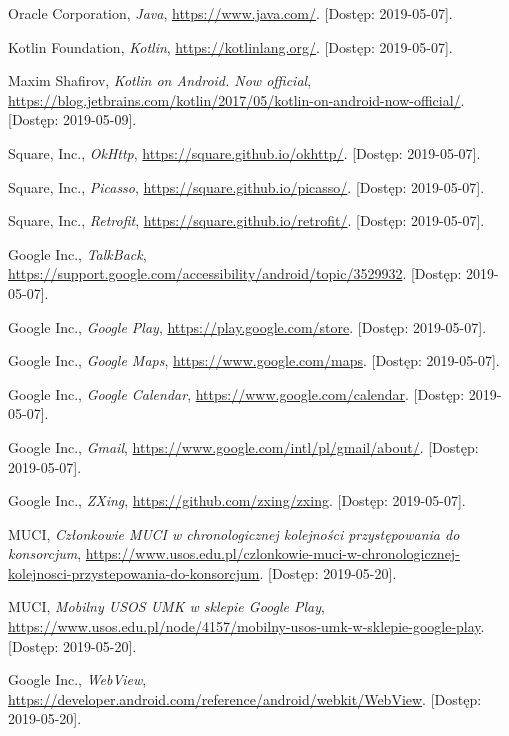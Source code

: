 \documentclass{pracamgr}
\begin{document}
\begin{thebibliography}{99}
 Oracle Corporation, \textit{Java}, \url{https://www.java.com/}. [Dostęp: 2019-05-07].

 Kotlin Foundation, \textit{Kotlin}, \url{https://kotlinlang.org/}. [Dostęp: 2019-05-07].

 Maxim Shafirov, \textit{Kotlin on Android. Now official},
	\url{https://blog.jetbrains.com/kotlin/2017/05/kotlin-on-android-now-official/}. [Dostęp: 2019-05-09].

 Square, Inc., \textit{OkHttp},	\url{https://square.github.io/okhttp/}. [Dostęp: 2019-05-07].

 Square, Inc., \textit{Picasso}, \url{https://square.github.io/picasso/}. [Dostęp: 2019-05-07].

 Square, Inc., \textit{Retrofit}, \url{https://square.github.io/retrofit/}. [Dostęp: 2019-05-07].

 Google Inc., \textit{TalkBack}, \url{https://support.google.com/accessibility/android/topic/3529932}. [Dostęp: 2019-05-07].

 Google Inc., \textit{Google Play}, \url{https://play.google.com/store}. [Dostęp: 2019-05-07].

 Google Inc., \textit{Google Maps},	\url{https://www.google.com/maps}. [Dostęp: 2019-05-07].

 Google Inc., \textit{Google Calendar},	\url{https://www.google.com/calendar}. [Dostęp: 2019-05-07].

 Google Inc., \textit{Gmail}, \url{https://www.google.com/intl/pl/gmail/about/}. [Dostęp: 2019-05-07].

 Google Inc., \textit{ZXing}, \url{https://github.com/zxing/zxing}. [Dostęp: 2019-05-07].

 MUCI, \textit{Członkowie MUCI w chronologicznej kolejności przystępowania do konsorcjum}, \url{https://www.usos.edu.pl/czlonkowie-muci-w-chronologicznej-kolejnosci-przystepowania-do-konsorcjum}. [Dostęp: 2019-05-20].

 MUCI, \textit{Mobilny USOS UMK w sklepie Google Play}, \url{https://www.usos.edu.pl/node/4157/mobilny-usos-umk-w-sklepie-google-play}. [Dostęp: 2019-05-20].

 Google Inc., \textit{WebView}, \url{https://developer.android.com/reference/android/webkit/WebView}. [Dostęp: 2019-05-20].


\end{thebibliography}
\end{document}
